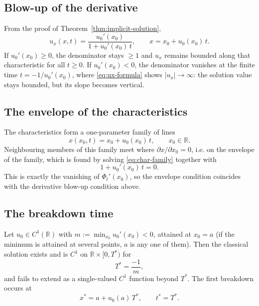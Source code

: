 \subsection{Blow-up of the derivative}
\label{subsec:shock-derivative-blowup}

From the proof of Theorem~\ref{thm:implicit-solution},
\begin{equation}
  \label{eq:ux-formula}
  u_x(x,t) = \frac{u_0'(x_0)}{1 + u_0'(x_0)\, t}, \qquad x = x_0 + u_0(x_0)\, t.
\end{equation}
If $u_0'(x_0) \geq 0$, the denominator stays $\geq 1$ and $u_x$ remains
bounded along that characteristic for all $t\geq0$. If $u_0'(x_0) < 0$,
the denominator vanishes at the finite time $t = -1/u_0'(x_0)$, where
\eqref{eq:ux-formula} shows $|u_x| \to \infty$: the solution value stays
bounded, but its slope becomes vertical.

\subsection{The envelope of the characteristics}
\label{subsec:envelope}

The characteristics form a one-parameter family of lines
\begin{equation}
  \label{eq:char-family}
  x(x_0, t) = x_0 + u_0(x_0)\, t, \qquad x_0 \in \mathbb{R}.
\end{equation}
Neighbouring members of this family meet where $\partial x/\partial x_0=0$,
i.e. on the envelope of the family, which is found by solving
\eqref{eq:char-family} together with
\begin{equation}
  \label{eq:envelope-condition}
  1 + u_0'(x_0)\, t = 0.
\end{equation}
This is exactly the vanishing of $\Phi_t'(x_0)$, so the envelope
condition coincides with the derivative blow-up condition above.

\subsection{The breakdown time}
\label{subsec:shock-time}

\begin{proposition}
\label{prop:shock-time}
Let $u_0 \in C^1(\mathbb{R})$ with $m := \min_{x_0} u_0'(x_0) < 0$,
attained at $x_0 = a$ (if the minimum is attained at several points, $a$
is any one of them). Then the classical solution exists and is $C^1$ on
$\mathbb{R} \times [0,T^*)$ for
\begin{equation}
  \label{eq:shock-time}
  T^* = \frac{-1}{m},
\end{equation}
and fails to extend as a single-valued $C^1$ function beyond $T^*$. The
first breakdown occurs at
\begin{equation}
  \label{eq:shock-location}
  x^* = a + u_0(a)\, T^*, \qquad t^* = T^*.
\end{equation}
\end{proposition}

